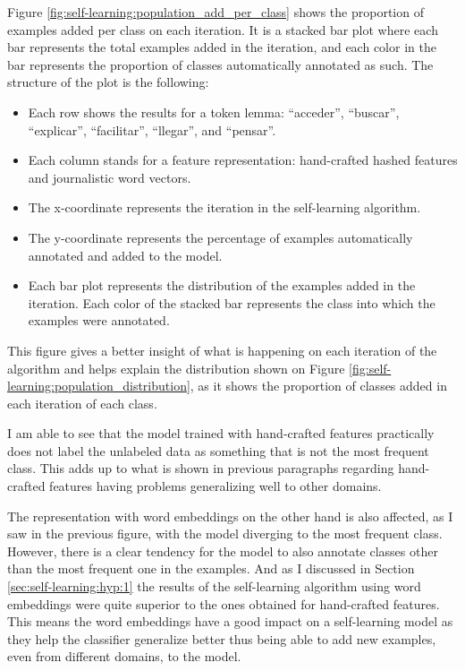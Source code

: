Figure \ref{fig:self-learning:population_add_per_class} shows the proportion of
examples added per class on each iteration. It is a stacked bar plot where each
bar represents the total examples added in the iteration, and each color in the
bar represents the proportion of classes automatically annotated as such. The
structure of the plot is the following:

\begin{itemize}
  \item Each row shows the results for a token lemma: ``acceder'', ``buscar'',
    ``explicar'', ``facilitar'', ``llegar'', and ``pensar''.
  \item Each column stands for a feature representation: hand-crafted hashed
    features and journalistic word vectors.
  \item The x-coordinate represents the iteration in the self-learning
    algorithm.
  \item The y-coordinate represents the percentage of examples automatically
    annotated and added to the model.
  \item Each bar plot represents the distribution of the examples added in the
    iteration. Each color of the stacked bar represents the class into which
    the examples were annotated.
\end{itemize}

This figure gives a better insight of what is happening on each iteration of
the algorithm and helps explain the distribution shown on Figure
\ref{fig:self-learning:population_distribution}, as it shows the proportion of
classes added in each iteration of each class.

I am able to see that the model trained with hand-crafted features practically
does not label the unlabeled data as something that is not the most frequent
class. This adds up to what is shown in previous paragraphs regarding
hand-crafted features having problems generalizing well to other domains.

The representation with word embeddings on the other hand is also affected, as
I saw in the previous figure, with the model diverging to the most frequent
class. However, there is a clear tendency for the model to also annotate
classes other than the most frequent one in the examples. And as I discussed in
Section \ref{sec:self-learning:hyp:1} the results of the self-learning
algorithm using word embeddings were quite superior to the ones obtained for
hand-crafted features. This means the word embeddings have a good impact on a
self-learning model as they help the classifier generalize better thus being
able to add new examples, even from different domains, to the model.


